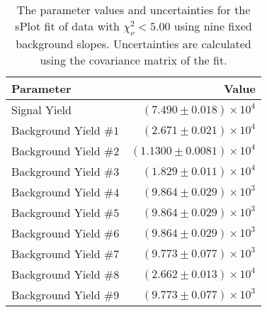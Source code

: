 
\begin{table}[ht]
    \begin{center}
        \begin{tabular}{lr}\toprule
            Parameter & Value \\\midrule
            Signal Yield & $(7.490 \pm 0.018) \times 10^{4}$ \\
            Background Yield $\#1$ & $(2.671 \pm 0.021) \times 10^{4}$ \\
            Background Yield $\#2$ & $(1.1300 \pm 0.0081) \times 10^{4}$ \\
            Background Yield $\#3$ & $(1.829 \pm 0.011) \times 10^{4}$ \\
            Background Yield $\#4$ & $(9.864 \pm 0.029) \times 10^{3}$ \\
            Background Yield $\#5$ & $(9.864 \pm 0.029) \times 10^{3}$ \\
            Background Yield $\#6$ & $(9.864 \pm 0.029) \times 10^{3}$ \\
            Background Yield $\#7$ & $(9.773 \pm 0.077) \times 10^{3}$ \\
            Background Yield $\#8$ & $(2.662 \pm 0.013) \times 10^{4}$ \\
            Background Yield $\#9$ & $(9.773 \pm 0.077) \times 10^{3}$ \\\bottomrule
        \end{tabular}
        \caption{The parameter values and uncertainties for the sPlot fit of data with $\chi^2_\nu < 5.00$ using nine fixed background slopes. Uncertainties are calculated using the covariance matrix of the fit.}\label{tab:splot-fit-results-chisqdof-5.00-fixed-9}
    \end{center}
\end{table}
